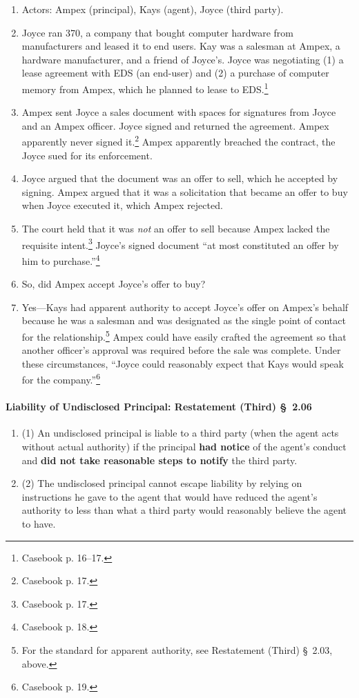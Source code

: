 \begin{enumerate}
    \item Actors: Ampex (principal), Kays (agent), Joyce (third party).
    \item Joyce ran 370, a company that bought computer hardware from 
    manufacturers and leased it to end users. Kay was a salesman at Ampex, a 
    hardware manufacturer, and a friend of Joyce's. Joyce was negotiating (1) 
    a lease agreement with EDS (an end-user) and (2) a purchase of computer 
    memory from Ampex, which he planned to lease to EDS.\footnote{Casebook p. 
    16--17.}
    \item Ampex sent Joyce a sales document with spaces for signatures from 
    Joyce and an Ampex officer. Joyce signed and returned the agreement. Ampex 
    apparently never signed it.\footnote{Casebook p. 17.} Ampex apparently 
    breached the contract, the Joyce sued for its enforcement.
    \item Joyce argued that the document was an offer to sell, which he 
    accepted by signing. Ampex argued that it was a solicitation that became 
    an offer to buy when Joyce executed it, which Ampex rejected.
    \item The court held that it was \emph{not} an offer to sell because Ampex 
    lacked the requisite intent.\footnote{Casebook p. 17.} Joyce's signed 
    document ``at most constituted an offer by him to 
    purchase.''\footnote{Casebook p. 18.}
    \item So, did Ampex accept Joyce's offer to buy?
    \item Yes---Kays had apparent authority to accept Joyce's offer on Ampex's 
    behalf because he was a salesman and was designated as the single point of 
    contact for the relationship.\footnote{For the standard for apparent 
    authority, see Restatement (Third) \S\ 2.03, above.} Ampex could have 
    easily crafted the agreement so that another officer's approval was 
    required before the sale was complete. Under these circumstances, ``Joyce 
    could reasonably expect that Kays would speak for the 
    company.''\footnote{Casebook p. 19.}
\end{enumerate}

\paragraph{Liability of Undisclosed Principal: Restatement (Third) \S\ 2.06}

\begin{enumerate}
    \item (1) An undisclosed principal is liable to a third party (when the 
    agent acts without actual authority) if the principal \textbf{had notice} 
    of the agent's conduct and \textbf{did not take reasonable steps to 
    notify} the third party.
    \item (2) The undisclosed principal cannot escape liability by relying on 
    instructions he gave to the agent that would have reduced the agent's 
    authority to less than what a third party would reasonably believe the 
    agent to have.
\end{enumerate}

